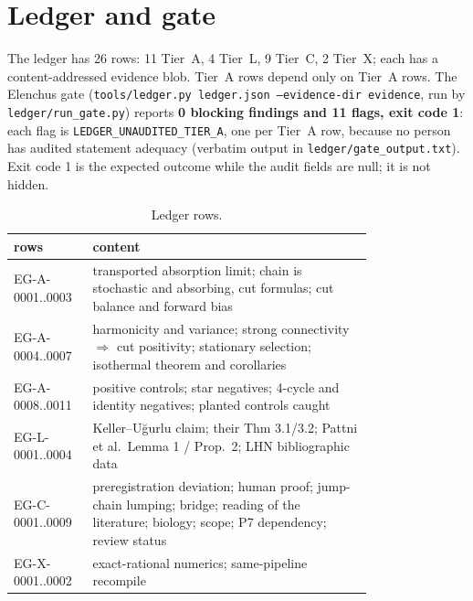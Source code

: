 \documentclass[11pt]{article}
\begin{document}
\section{Ledger and gate}\label{sec:ledger}
The ledger has 26 rows: 11 Tier~A, 4 Tier~L, 9 Tier~C, 2 Tier~X; each has a content-addressed evidence blob. Tier~A rows depend only on Tier~A rows. The Elenchus gate (\texttt{tools/ledger.py ledger.json --evidence-dir evidence}, run by \texttt{ledger/run\_gate.py}) reports \textbf{0 blocking findings and 11 flags, exit code 1}: each flag is \texttt{LEDGER\_UNAUDITED\_TIER\_A}, one per Tier~A row, because no person has audited statement adequacy (verbatim output in \texttt{ledger/gate\_output.txt}). Exit code 1 is the expected outcome while the audit fields are null; it is not hidden.
\begin{table}[ht]\centering\scriptsize
\begin{tabular}{lp{0.78\linewidth}}
\toprule
rows & content\\
\midrule
EG-A-0001..0003 & transported absorption limit; chain is stochastic and absorbing, cut formulas; cut balance and forward bias\\
EG-A-0004..0007 & harmonicity and variance; strong connectivity $\Rightarrow$ cut positivity; stationary selection; isothermal theorem and corollaries\\
EG-A-0008..0011 & positive controls; star negatives; 4-cycle and identity negatives; planted controls caught\\
EG-L-0001..0004 & Keller--U\u{g}urlu claim; their Thm 3.1/3.2; Pattni et al.\ Lemma 1 / Prop.~2; LHN bibliographic data\\
EG-C-0001..0009 & preregistration deviation; human proof; jump-chain lumping; bridge; reading of the literature; biology; scope; P7 dependency; review status\\
EG-X-0001..0002 & exact-rational numerics; same-pipeline recompile\\
\bottomrule
\end{tabular}
\caption{Ledger rows.}\label{tab:ledger}
\end{table}
\end{document}
